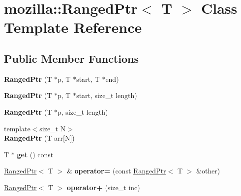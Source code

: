 \hypertarget{classmozilla_1_1_ranged_ptr}{\section{mozilla\-:\-:Ranged\-Ptr$<$ T $>$ Class Template Reference}
\label{classmozilla_1_1_ranged_ptr}
}
\subsection*{Public Member Functions}
\begin{DoxyCompactItemize}
\item 
\hypertarget{classmozilla_1_1_ranged_ptr_af1cc2c2befbe1d2ed13ca45042f03525}{{\bfseries Ranged\-Ptr} (T $\ast$p, T $\ast$start, T $\ast$end)}\label{classmozilla_1_1_ranged_ptr_af1cc2c2befbe1d2ed13ca45042f03525}

\item 
\hypertarget{classmozilla_1_1_ranged_ptr_a39c4573511a6f285d94cb643ee1b235c}{{\bfseries Ranged\-Ptr} (T $\ast$p, T $\ast$start, size\-\_\-t length)}\label{classmozilla_1_1_ranged_ptr_a39c4573511a6f285d94cb643ee1b235c}

\item 
\hypertarget{classmozilla_1_1_ranged_ptr_a036291f094200e78a49c54afc4b1ba49}{{\bfseries Ranged\-Ptr} (T $\ast$p, size\-\_\-t length)}\label{classmozilla_1_1_ranged_ptr_a036291f094200e78a49c54afc4b1ba49}

\item 
\hypertarget{classmozilla_1_1_ranged_ptr_ac4911d7d67fe3a1669770788d0e970ed}{{\footnotesize template$<$size\-\_\-t N$>$ }\\{\bfseries Ranged\-Ptr} (T arr\mbox{[}N\mbox{]})}\label{classmozilla_1_1_ranged_ptr_ac4911d7d67fe3a1669770788d0e970ed}

\item 
\hypertarget{classmozilla_1_1_ranged_ptr_acbe4dea95d5dabd651e2c7ff81a8ea7e}{T $\ast$ {\bfseries get} () const }\label{classmozilla_1_1_ranged_ptr_acbe4dea95d5dabd651e2c7ff81a8ea7e}

\item 
\hypertarget{classmozilla_1_1_ranged_ptr_a4a447b8dd2fb8f1b317d8505058b4c8d}{\hyperlink{classmozilla_1_1_ranged_ptr}{Ranged\-Ptr}$<$ T $>$ \& {\bfseries operator=} (const \hyperlink{classmozilla_1_1_ranged_ptr}{Ranged\-Ptr}$<$ T $>$ \&other)}\label{classmozilla_1_1_ranged_ptr_a4a447b8dd2fb8f1b317d8505058b4c8d}

\item 
\hypertarget{classmozilla_1_1_ranged_ptr_ace7bf00cf6764086f8065d2bce4dea6b}{\hyperlink{classmozilla_1_1_ranged_ptr}{Ranged\-Ptr}$<$ T $>$ {\bfseries operator+} (size\-\_\-t inc)}\label{classmozilla_1_1_ranged_ptr_ace7bf00cf6764086f8065d2bce4dea6b}


\end{DoxyCompactItemize}

